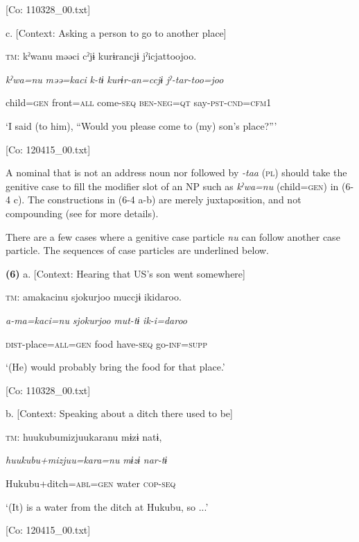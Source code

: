       [Co: 110328\_00.txt]

  c.  [Context: Asking a person to go to another place]

    \textsc{tm}:  kˀwanu  məəci  cˀjɨ  kurɨrancjɨ  jˀicjattoojoo.

      \textit{kˀwa=nu}  \textit{məə=kaci}  \textit{k-tɨ}  \textit{kurɨr-an=ccjɨ}  \textit{jˀ-tar-too=joo}

      child=\textsc{gen}  front=\textsc{all}  come-\textsc{seq}  \textsc{ben}-\textsc{neg}=\textsc{qt}  say-\textsc{pst}-\textsc{cnd}=\textsc{cfm}1

      ‘I said (to him), “Would you please come to (my) son’s place?”’

      [Co: 120415\_00.txt]

A nominal that is not an address noun nor followed by \textit{{}-taa} (\textsc{pl}) should take the genitive case to fill the modifier slot of an NP such as \textit{kˀwa=nu} (child=\textsc{gen}) in (6-4 c). The constructions in (6-4 a-b) are merely juxtaposition, and not compounding (see  for more details).

  There are a few cases where a genitive case particle \textit{nu} can follow another case particle. The sequences of case particles are underlined below.

\textbf{(6)}  a.  [Context: Hearing that US’s son went somewhere]

    \textsc{tm}:  amakacinu  {\textbar}sjokurjoo{\textbar}  muccjɨ  ikidaroo.

      \textit{a-ma=kaci=nu}  \textit{sjokurjoo}  \textit{mut-tɨ}  \textit{ik-i=daroo}

      \textsc{dist}-place=\textsc{all}=\textsc{gen}  food  have-\textsc{seq}  go-\textsc{inf}=\textsc{supp}

      ‘(He) would probably bring the food for that place.’

      [Co: 110328\_00.txt]

  b.  [Context: Speaking about a ditch there used to be]

    \textsc{tm}:  huukubumizjuukaranu  mɨzɨ  natɨ,

      \textit{huukubu+mizjuu=kara=nu}  \textit{mɨzɨ}  \textit{nar-tɨ}

      Hukubu+ditch=\textsc{abl}=\textsc{gen}  water  \textsc{cop}-\textsc{seq}

      ‘(It) is a water from the ditch at Hukubu, so ...’

      [Co: 120415\_00.txt]

